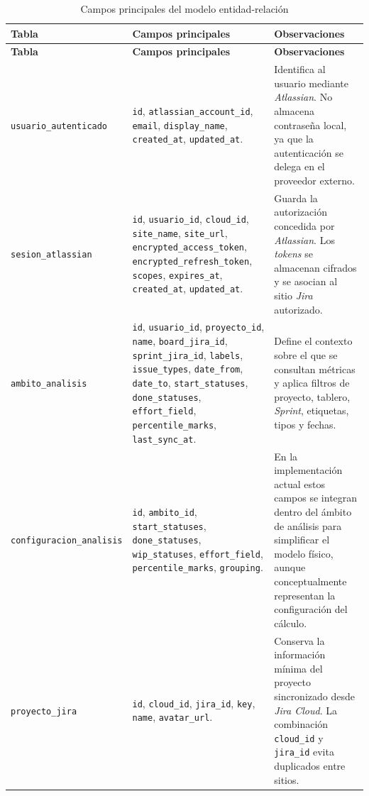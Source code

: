 \begin{landscape}
{\footnotesize
\begin{longtable}{>{\raggedright\arraybackslash}p{5.2cm}>{\raggedright\arraybackslash}p{12.0cm}>{\raggedright\arraybackslash}p{6.0cm}}
\caption{Campos principales del modelo entidad-relación}
\label{tab:campos-er}\\
\toprule
\textbf{Tabla} & \textbf{Campos principales} & \textbf{Observaciones} \\
\midrule
\endfirsthead
\toprule
\textbf{Tabla} & \textbf{Campos principales} & \textbf{Observaciones} \\
\midrule
\endhead
\bottomrule
\endfoot
\texttt{usuario\_autenticado} & \texttt{id}, \texttt{atlassian\_account\_id}, \texttt{email}, \texttt{display\_name}, \texttt{created\_at}, \texttt{updated\_at}. & Identifica al usuario mediante \textit{Atlassian}. No almacena contraseña local, ya que la autenticación se delega en el proveedor externo. \\
\texttt{sesion\_atlassian} & \texttt{id}, \texttt{usuario\_id}, \texttt{cloud\_id}, \texttt{site\_name}, \texttt{site\_url}, \texttt{encrypted\_access\_token}, \texttt{encrypted\_refresh\_token}, \texttt{scopes}, \texttt{expires\_at}, \texttt{created\_at}, \texttt{updated\_at}. & Guarda la autorización concedida por \textit{Atlassian}. Los \textit{tokens} se almacenan cifrados y se asocian al sitio \textit{Jira} autorizado. \\
\texttt{ambito\_analisis} & \texttt{id}, \texttt{usuario\_id}, \texttt{proyecto\_id}, \texttt{name}, \texttt{board\_jira\_id}, \texttt{sprint\_jira\_id}, \texttt{labels}, \texttt{issue\_types}, \texttt{date\_from}, \texttt{date\_to}, \texttt{start\_statuses}, \texttt{done\_statuses}, \texttt{effort\_field}, \texttt{percentile\_marks}, \texttt{last\_sync\_at}. & Define el contexto sobre el que se consultan métricas y aplica filtros de proyecto, tablero, \textit{Sprint}, etiquetas, tipos y fechas. \\
\texttt{configuracion\_analisis} & \texttt{id}, \texttt{ambito\_id}, \texttt{start\_statuses}, \texttt{done\_statuses}, \texttt{wip\_statuses}, \texttt{effort\_field}, \texttt{percentile\_marks}, \texttt{grouping}. & En la implementación actual estos campos se integran dentro del ámbito de análisis para simplificar el modelo físico, aunque conceptualmente representan la configuración del cálculo. \\
\texttt{proyecto\_jira} & \texttt{id}, \texttt{cloud\_id}, \texttt{jira\_id}, \texttt{key}, \texttt{name}, \texttt{avatar\_url}. & Conserva la información mínima del proyecto sincronizado desde \textit{Jira Cloud}. La combinación \texttt{cloud\_id} y \texttt{jira\_id} evita duplicados entre sitios. \\

\end{longtable}}
\end{landscape}

